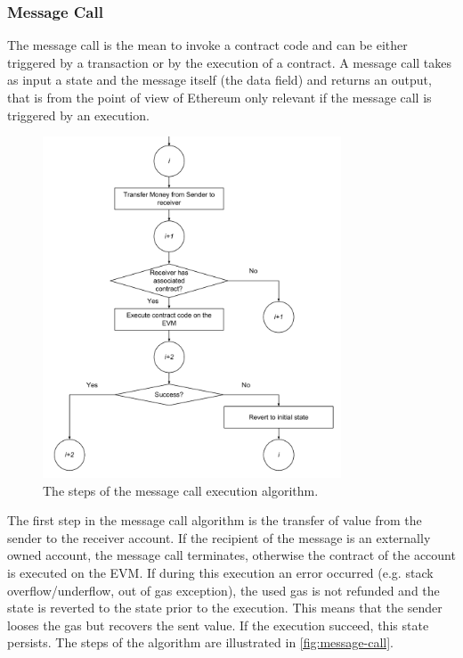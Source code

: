\subsubsection{Message Call}
\label{sec:message-call}
The message call is the mean to invoke a contract code and can be either
triggered by a transaction or by the execution of a contract. A message call
takes as input a state and the message itself (the data field) and returns an
output, that is from the point of view of Ethereum only relevant if the message
call is triggered by an execution.

\begin{figure}
	\begin{center}
		\includegraphics[width=0.79\textwidth]{./res/img/message-call.pdf}
	\end{center}
	\caption{The steps of the message call execution algorithm.}
	\label{fig:message-call}
\end{figure}

The first step in the message call algorithm is the transfer of value from the
sender to the receiver account. If the recipient of the message is an externally
owned account, the message call terminates, otherwise the contract of the
account is executed on the EVM. If during this execution an error occurred (e.g.
stack overflow/underflow, out of gas exception), the used gas is not refunded
and the state is reverted to the state prior to the execution. This means that
the sender looses the gas but recovers the sent value. If the execution succeed,
this state persists. The steps of the algorithm are illustrated in
\autoref{fig:message-call}.